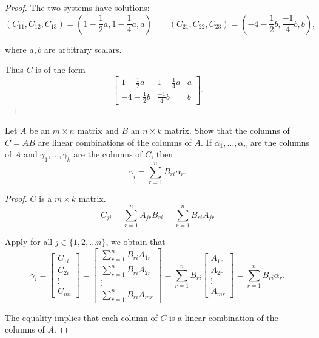 \begin{proof}
    The two systems have solutions:
    \[
        (C_{11}, C_{12}, C_{13}) = (1 - \frac{1}{2}a, 1 - \frac{1}{4}a, a)\qquad (C_{21}, C_{22}, C_{23}) = (-4 - \frac{1}{2}b, \frac{-1}{4}b, b),
    \]

    where $a, b$ are arbitrary scalars.

    Thus $C$ is of the form
    \[
        \begin{bmatrix}
            1 - \frac{1}{2}a  & 1 - \frac{1}{4}a & a \\
            -4 - \frac{1}{2}b & \frac{-1}{4}b    & b
        \end{bmatrix}.
    \]
\end{proof}

\begin{exercise}
    Let $A$ be an $m\times n$ matrix and $B$ an $n\times k$ matrix. Show that the columns of $C = AB$ are linear combinations of the columns of $A$. If $\alpha_{1},\ldots,\alpha_{n}$ are the columns of $A$ and $\gamma_{1},\ldots,\gamma_{k}$ are the columns of $C$, then
    \[
        \gamma_{i} = \sum^{n}_{r=1} B_{ri}\alpha_{r}.
    \]
\end{exercise}

\begin{proof}
    $C$ is a $m\times k$ matrix.
    \[
        C_{ji} = \sum^{n}_{r=1} A_{jr}B_{ri} = \sum^{n}_{r=1} B_{ri}A_{jr}
    \]

    Apply for all $j\in \{ 1, 2,\ldots n \}$, we obtain that
    \[
        \gamma_{i} =
        \begin{bmatrix}
            C_{1i} \\
            C_{2i} \\
            \vdots \\
            C_{mi}
        \end{bmatrix}
        = \begin{bmatrix}
            \sum^{n}_{r=1}B_{ri}A_{1r} \\
            \sum^{n}_{r=1}B_{ri}A_{2r} \\
            \vdots                     \\
            \sum^{n}_{r=1}B_{ri}A_{mr}
        \end{bmatrix}
        = \sum^{n}_{r=1}B_{ri}\begin{bmatrix}
            A_{1r} \\
            A_{2r} \\
            \vdots \\
            A_{mr}
        \end{bmatrix}
        = \sum^{n}_{r=1}B_{ri}\alpha_{r}.
    \]

    The equality implies that each column of $C$ is a linear combination of the columns of $A$.
\end{proof}

